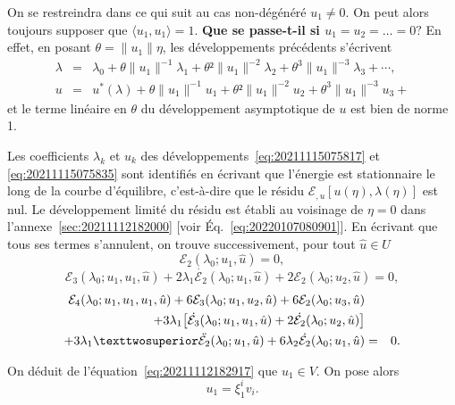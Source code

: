 \documentclass[12pt, final]{amsart}
\begin{document}
On se restreindra dans ce qui suit au cas non-dégénéré \(u_1\neq0\). On peut alors
toujours supposer que \(\langle u_1, u_1\rangle =1\). \textbf{Que se passe-t-il si
  \(u_1=u_2=\ldots=0 ?\)} En effet, en posant \(\theta=\lVert u_1\rVert \eta \), les développements
précédents s'écrivent
\begin{eqnarray}
  \lambda &=&\lambda _0+\theta\lVert u_1\rVert^{-1}\lambda _1+\theta²\lVert u_1\rVert^{-2}\lambda _2+\theta^3\lVert u_1\rVert^{-3}\lambda _3+\cdots,\\
  u&=&u^*(\lambda )+\theta\lVert u_1\rVert^{-1}u_1+\theta²\lVert u_1\rVert^{-2}u_2+\theta^3\lVert u_1\rVert^{-3}u_3+
\end{eqnarray}
et le terme linéaire en \(\theta\) du développement asymptotique de \(u\) est bien
de norme 1.

Les coefficients \(\lambda  _k\) et \(u_k\) des développements~\eqref{eq:20211115075817}
et \eqref{eq:20211115075835} sont identifiés en écrivant que l'énergie est
stationnaire le long de la courbe d'équilibre, c'est-à-dire que le résidu
\(\mathcal E_{,u}[u(\eta ), \lambda (\eta )]\) est nul. Le développement limité du résidu est établi au
voisinage de \(\eta =0\) dans l'annexe~\ref{sec:20211112182000} [voir
Éq.~\eqref{eq:20220107080901}]. En écrivant que tous ses termes s'annulent, on
trouve successivement, pour tout \(\hat{u}\in U\)
\begin{equation}
  \label{eq:20211112182917}
  \mathcal E_2(\lambda _0; u_1, \hat{u})=0,
\end{equation}
\begin{equation}
  \label{eq:20211112183220}
  \mathcal E_3(\lambda _0; u_1, u_1, \hat{u})+2\lambda _1\dot{\mathcal E_2}(\lambda _0; u_1, \hat{u})+2\mathcal E_2(\lambda _0; u_2, \hat{u})=0,
\end{equation}
\begin{eqnarray}
  \notag
  \mathcal E_4(\lambda _0; u_1, u_1, u_1, \hat{u})+6\mathcal E_3(\lambda _0; u_1, u_2, \hat{u})+6\mathcal E_2(\lambda _0; u_3, \hat{u})&&\\
  \notag
  +3\lambda _1\bigl[\dot{\mathcal E_3}(\lambda _0; u_1, u_1, \hat{u})+2\dot{\mathcal E_2}(\lambda _0; u_2, \hat{u})\bigr]&&\\
  \label{eq:20220114135717}
  +3\lambda _1²\ddot{\mathcal E_2}(\lambda _0; u_1, \hat{u})
  +6\lambda _2\dot{\mathcal E_2}(\lambda _0; u_1, \hat{u})&=&0.
\end{eqnarray}

On déduit de l'équation~\eqref{eq:20211112182917} que \(u_1\in V\). On pose alors
\begin{equation}
  \label{eq:20220124135236}
  u_1=\xi _1^i v_i.
\end{equation}
\end{document}

